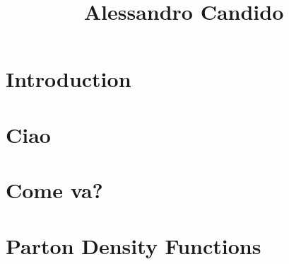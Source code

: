 \documentclass[10pt, a4paper, sans]{moderncv}
\title{Alessandro Candido}
\begin{document}
\setlength{\hintscolumnwidth}{10ex}

\makecvtitle

\blindtext

\begin{multicols}{2}

\section{Introduction}
\blindtext\blindtext

\section{Ciao}
\blindtext\blindtext

\section{Come va?}
\blindtext\blindtext

\section{Parton Density Functions}
\blindtext\blindtext
\blindtext\blindtext

\end{multicols}

\makecvfoot
\end{document}
